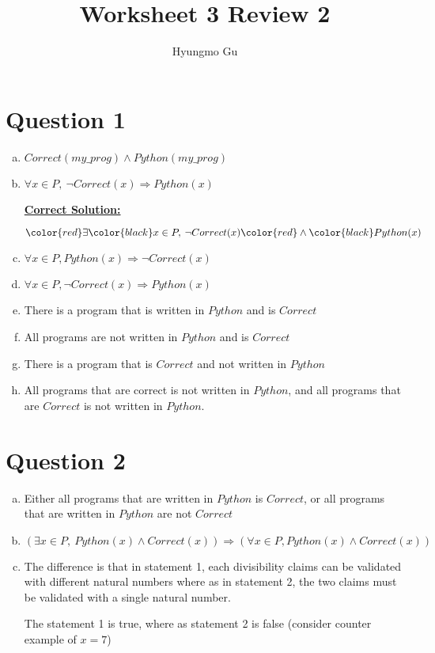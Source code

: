 \documentclass[12pt]{article}
\begin{document}
\title{Worksheet 3 Review 2}
\author{Hyungmo Gu}
\maketitle

\section*{Question 1}
\begin{enumerate}[a.]
    \item $Correct(my\_prog) \land Python(my\_prog)$
    \item

    $\forall x \in P,\: \neg Correct(x) \Rightarrow Python(x)$

    \begin{mdframed}
        \underline{\textbf{Correct Solution:}}

        \bigskip

        $\color{red}\exists\color{black} x \in P,\: \neg Correct(x) \color{red}\land\color{black} Python(x)$
    \end{mdframed}

    \item $\forall x \in P, Python(x) \Rightarrow \neg Correct(x)$
    \item $\forall x \in P, \neg Correct(x) \Rightarrow Python(x)$
    \item There is a program that is written in $Python$ and is $Correct$
    \item All programs are not written in $Python$ and is $Correct$
    \item There is a program that is $Correct$ and not written in $Python$
    \item All programs that are correct is not written in $Python$, and all
    programs that are $Correct$ is not written in $Python$.
\end{enumerate}

\section*{Question 2}
\begin{enumerate}[a.]
    \item Either all programs that are written in $Python$ is $Correct$, or
    all programs that are written in $Python$ are not $Correct$
    \item $(\exists x \in P,\:Python(x) \land Correct(x)) \Rightarrow
    (\forall x \in P, Python(x) \land Correct(x))$
    \item The difference is that in statement 1, each divisibility claims can be
    validated with different natural numbers where as in statement 2,
    the two claims must be validated with a single natural number.

    \bigskip

    The statement 1 is true, where as statement 2 is false (consider counter example
    of $x = 7$)
\end{enumerate}
\end{document}
